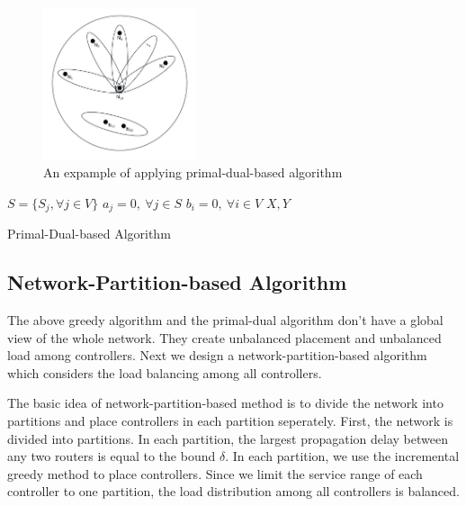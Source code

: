 \documentclass[conference]{IEEEtran}
\begin{document}
\begin{figure}[!htbp]
\center
\includegraphics[width=0.4\textwidth]{fig/set-cover.pdf}
\caption{An expample of applying primal-dual-based algorithm}
\label{fig:example}
\end{figure}

\begin{algorithm}[!htbp]
\BlankLine
{}
$S=\{S_j, \forall j\in V\}$ \;
$a_j=0, \ \forall j\in S$ \;
$b_i=0, \ \forall i\in V$ \;
\Return $X, Y$
\caption{Primal-Dual-based Algorithm}
\label{alg:primal-dual}
\end{algorithm}

\subsection{Network-Partition-based Algorithm}
The above greedy algorithm and the primal-dual algorithm don't have a global view of the whole network. They create unbalanced placement and unbalanced load among controllers. Next we design a network-partition-based algorithm which considers the load balancing among all controllers. 

The basic idea of network-partition-based method is to divide the network into partitions and place controllers in each partition seperately. First, the network is divided into partitions. In each partition, the largest propagation delay between any two routers is equal to the bound $\delta$. In each partition, we use the incremental greedy method to place controllers. Since we limit the service range of each controller to one partition, the load distribution among all controllers is balanced.
\end{document}

